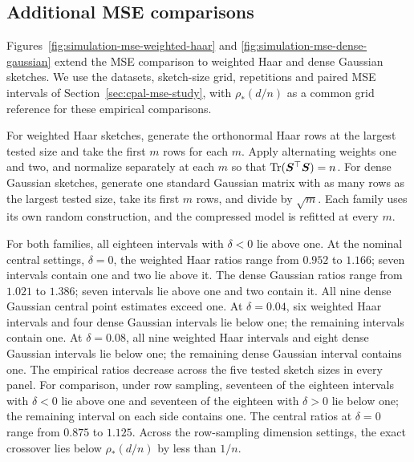 \documentclass{article}
\theoremstyle{plain} %
\theoremstyle{definition} %
\theoremstyle{definition} %
\begin{document}
\FloatBarrier

\subsection{Additional MSE comparisons}
\label{sec:simulation-complementary-corrected}
\label{sec:simulation-mse-threshold}
\label{app:simulation-mse-sketch-families}
Figures~\ref{fig:simulation-mse-weighted-haar} and
\ref{fig:simulation-mse-dense-gaussian} extend the MSE comparison to
weighted Haar and dense Gaussian sketches. We use the datasets,
sketch-size grid, repetitions and paired MSE intervals of
Section~\ref{sec:cpal-mse-study}, with $\rho_*(d/n)$ as a common grid
reference for these empirical comparisons.

For weighted Haar sketches, generate the orthonormal Haar rows at the
largest tested size and take the first $m$ rows for each $m$.
Apply alternating weights one and two, and normalize separately at each
$m$ so that $\operatorname{Tr}(\boldsymbol{S}^\top\boldsymbol{S})=n$.
For dense Gaussian sketches, generate one standard Gaussian matrix
with as many rows as the largest tested size, take its first $m$ rows,
and divide by $\sqrt m$. Each family uses its own random construction,
and the compressed model is refitted at every $m$.

For both families, all eighteen intervals with $\delta<0$ lie above one.
At the nominal central settings, $\delta=0$, the weighted Haar ratios
range from $0.952$ to $1.166$; seven intervals contain one and two lie
above it. The dense Gaussian ratios range from $1.021$ to $1.386$;
seven intervals lie above one and two contain it. All nine dense Gaussian
central point estimates exceed one.
At $\delta=0.04$, six weighted Haar intervals and four dense Gaussian
intervals lie below one; the remaining intervals contain one.
At $\delta=0.08$, all nine weighted Haar intervals and eight dense
Gaussian intervals lie below one; the remaining dense Gaussian interval
contains one. The empirical ratios decrease across the five tested
sketch sizes in every panel. For comparison, under row sampling,
seventeen of the eighteen intervals with $\delta<0$
lie above one and seventeen of the eighteen with $\delta>0$ lie below
one; the remaining interval on each side contains one.
The central ratios at $\delta=0$ range from $0.875$ to $1.125$.
Across the row-sampling dimension settings, the exact crossover lies below
$\rho_*(d/n)$ by less than $1/n$.
\end{document}
